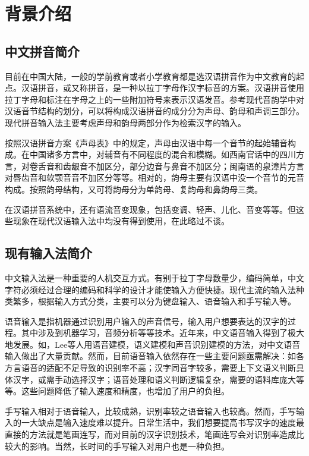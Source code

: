 \chapter{背景介绍}
  \section{中文拼音简介\label{sec:intro}}

  目前在中国大陆，一般的学前教育或者小学教育都是选汉语拼音作为中文教育的起点。汉语拼音，或又称拼音，是一种以拉丁字母作汉字标音的方案。\supercite{wjm}汉语拼音使用拉丁字母和标注在字母之上的一些附加符号来表示汉语发音。参考现代音韵学中对汉语音节结构的划分，可以将构成汉语拼音的成分分为声母、韵母和声调三部分。现代拼音输入法主要考虑声母和韵母两部分作为检索汉字的输入。

  按照汉语拼音方案《声母表》中的规定，声母由汉语中每一个音节的起始辅音构成。在中国诸多方言中，对辅音有不同程度的混合和模糊。如西南官话中的四川方言，对卷舌音和齿龈音不加区分，部分边音与鼻音不加区分；闽南语的泉漳片方言对唇齿音和软颚音音不加区分等等。\supercite{jdp}相对的，韵母主要有汉语中没一个音节的元音构成。按照韵母结构，又可将韵母分为单韵母、复韵母和鼻韵母三类。

  在汉语拼音系统中，还有语流音变现象，包括变调、轻声、儿化、音变等等。但这些现象在现代汉语输入法中均没有得到使用，在此略过不谈。

  \section{现有输入法简介\label{sec:current_input}}

  中文输入法是一种重要的人机交互方式。有别于拉丁字母数量少，编码简单，中文字符必须经过合理的编码和科学的设计才能使输入方便快捷。现代主流的输入法种类繁多，根据输入方式分类，主要可以分为键盘输入、语音输入和手写输入等。

  语音输入是指机器通过识别用户输入的声音信号，输入用户想要表达的汉字的过程。其中涉及到机器学习，音频分析等等技术。近年来，中文语音输入得到了极大地发展。如，Lee等人\supercite{lee5system, lee1997voice, lee1993mandarin}用语音建模，语义建模和声音识别建模的方法，对中文语音输入做出了大量贡献。然而，目前语音输入依然存在一些主要问题亟需解决：如各方言语音的适配不足导致的识别率不高\supercite{chen2000tone}；汉字同音字较多，需要上下文语义判断具体汉字，或需手动选择汉字；语音处理和语义判断逻辑复杂，需要的语料库庞大等等。这些问题降低了输入速度和精度，也增加了用户的负担。

  手写输入相对于语音输入，比较成熟，识别率较之语音输入也较高。然而，手写输入的一大缺点是输入速度难以提升。日常生活中，我们想要提高书写汉字的速度最直接的方法就是笔画连写，而对目前的汉字识别技术，笔画连写会对识别率造成比较大的影响。\supercite{srihari2007offline}当然，长时间的手写输入对用户也是一种负担。

